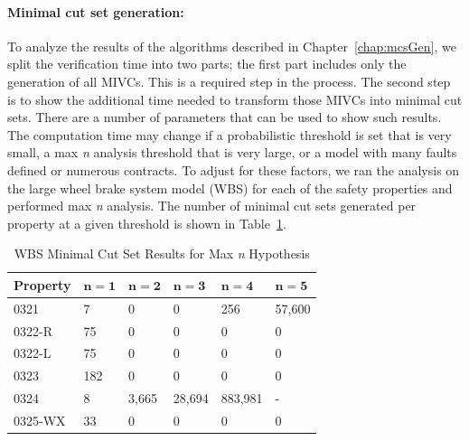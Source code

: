 \paragraph{Minimal cut set generation:} To analyze the results of the algorithms described in Chapter~\ref{chap:mcsGen}, we split the verification time into two parts; the first part includes only the generation of all MIVCs. This is a required step in the process. The second step is to show the additional time needed to transform those MIVCs into minimal cut sets. There are a number of parameters that can be used to show such results. The computation time may change if a probabilistic threshold is set that is very small, a max \textit{n} analysis threshold that is very large, or a model with many faults defined or numerous contracts. To adjust for these factors, we ran the analysis on the large wheel brake system model (WBS) for each of the safety properties and performed max \textit{n} analysis. The number of minimal cut sets generated per property at a given threshold is shown in Table~\ref{tab:wbs_maxN_results}.
\begin{table}[htbp]
\begin{center}
    \begin{tabular}{ | l | l | l | l | l | l |}
    \hline
    \textbf{Property} & $\bm{n = 1}$ & $\bm{n = 2}$ & $\bm{n = 3}$ & $\bm{n = 4}$ 
		& $\bm{n = 5}$    \\ \hline \hline
    0321 & 7 & 0 & 0 & 256 & 57,600   \\ \hline
    0322-R & 75 & 0 & 0 & 0 & 0  \\ \hline
    0322-L & 75 & 0 & 0 & 0 & 0  \\ \hline
    0323 & 182 & 0 & 0 & 0 & 0  \\ \hline
    0324 & 8 & 3,665 & 28,694 & 883,981 & - \\ \hline
    0325-WX & 33 & 0 & 0 &0 &0 \\ \hline
    \end{tabular}
    \caption{WBS Minimal Cut Set Results for Max \textit{n} Hypothesis}
    \label{tab:wbs_maxN_results}
    \end{center}
\end{table}

